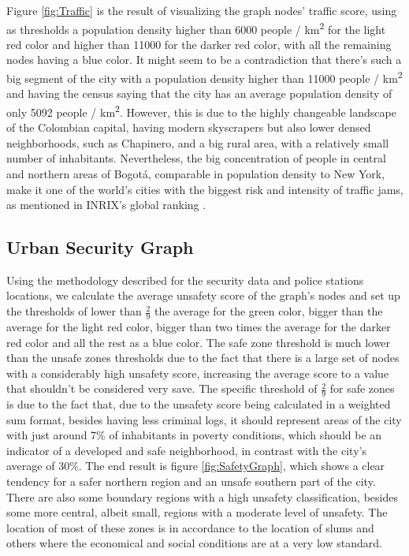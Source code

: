 \documentclass[runningheads]{llncs}
\begin{document}
Figure \ref{fig:Traffic} is the result of visualizing the graph nodes' traffic score, using as thresholds a population density higher than 6000 people / km\textsuperscript{2} for the light red color and higher than 11000 for the darker red color, with all the remaining nodes having a blue color. It might seem to be a contradiction that there's such a big segment of the city with a population density higher than 11000 people / km\textsuperscript{2} and having the census saying that the city has an average population density of only 5092 people / km\textsuperscript{2}. However, this is due to the highly changeable landscape of the Colombian capital, having modern skyscrapers but also lower densed neighborhoods, such as Chapinero, and a big rural area, with a relatively small number of inhabitants. Nevertheless, the big concentration of people in central and northern areas of Bogotá, comparable in population density to New York, make it one of the world's cities with the biggest risk and intensity of traffic jams, as mentioned in INRIX's global ranking \cite{noauthor_inrix_2017}.


\subsection{Urban Security Graph}

Using the methodology described for the security data and police stations locations, we calculate the average unsafety score of the graph's nodes and set up the thresholds of lower than $\frac{2}{9}$ the average for the green color, bigger than the average for the light red color, bigger than two times the average for the darker red color and all the rest as a blue color. The safe zone threshold is much lower than the unsafe zones thresholds due to the fact that there is a large set of nodes with a considerably high unsafety score, increasing the average score to a value that shouldn't be considered very save. The specific threshold of $\frac{2}{9}$ for safe zones is due to the fact that, due to the unsafety score being calculated in a weighted sum format, besides having less criminal logs, it should represent areas of the city with just around 7\% of inhabitants in poverty conditions, which should be an indicator of a developed and safe neighborhood, in contrast with the city's average of 30\%. The end result is figure \ref{fig:SafetyGraph}, which shows a clear tendency for a safer northern region and an unsafe southern part of the city. There are also some boundary regions with a high unsafety classification, besides some more central, albeit small, regions with a moderate level of unsafety. The location of most of these zones is in accordance to the location of slums \cite{rueda-garcia_case_2003} and others where the economical and social conditions are at a very low standard.
\end{document}
